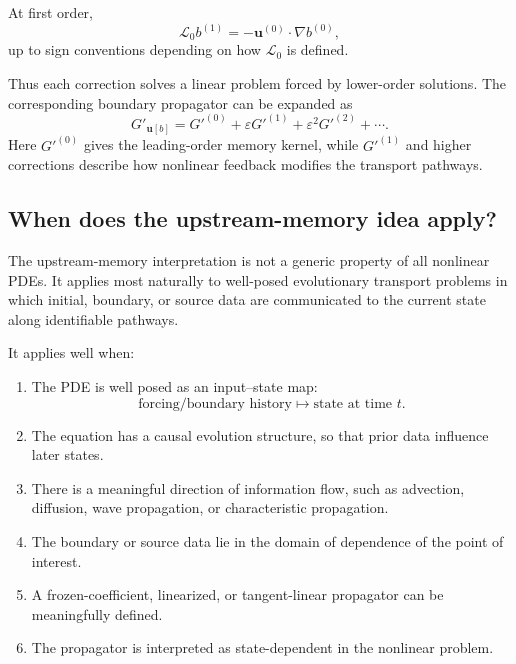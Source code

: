 \documentclass[10pt]{amsart}
\begin{document}
At first order,
\begin{equation}
\mathcal L_0 b^{(1)}
=
-\mathbf u^{(0)}\cdot\nabla b^{(0)},
\end{equation}
up to sign conventions depending on how \(\mathcal L_0\) is defined.

Thus each correction solves a linear problem forced by lower-order solutions. The corresponding boundary propagator can be expanded as
\begin{equation}
G'_{\mathbf u[b]}
=
G'^{(0)}
+
\varepsilon G'^{(1)}
+
\varepsilon^2 G'^{(2)}
+\cdots.
\end{equation}
Here \(G'^{(0)}\) gives the leading-order memory kernel, while \(G'^{(1)}\) and higher corrections describe how nonlinear feedback modifies the transport pathways.

\subsection{When does the upstream-memory idea apply?}

The upstream-memory interpretation is not a generic property of all nonlinear PDEs. It applies most naturally to well-posed evolutionary transport problems in which initial, boundary, or source data are communicated to the current state along identifiable pathways.

It applies well when:
\begin{enumerate}
\item The PDE is well posed as an input--state map:
\[
\text{forcing/boundary history}
\longmapsto
\text{state at time }t.
\]

\item The equation has a causal evolution structure, so that prior data influence later states.

\item There is a meaningful direction of information flow, such as advection, diffusion, wave propagation, or characteristic propagation.

\item The boundary or source data lie in the domain of dependence of the point of interest.

\item A frozen-coefficient, linearized, or tangent-linear propagator can be meaningfully defined.

\item The propagator is interpreted as state-dependent in the nonlinear problem.
\end{enumerate}
\end{document}
